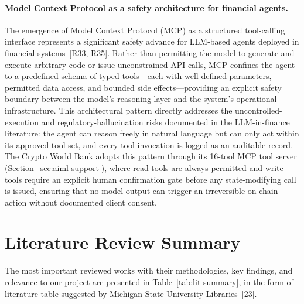 \documentclass[12pt,a4paper]{report}
\begin{document}
\paragraph{Model Context Protocol as a safety architecture for financial agents.}
The emergence of Model Context Protocol (MCP) as a structured tool-calling interface represents a significant safety advance for LLM-based agents deployed in financial systems~[R33, R35]. Rather than permitting the model to generate and execute arbitrary code or issue unconstrained API calls, MCP confines the agent to a predefined schema of typed tools---each with well-defined parameters, permitted data access, and bounded side effects---providing an explicit safety boundary between the model's reasoning layer and the system's operational infrastructure. This architectural pattern directly addresses the uncontrolled-execution and regulatory-hallucination risks documented in the LLM-in-finance literature: the agent can reason freely in natural language but can only act within its approved tool set, and every tool invocation is logged as an auditable record. The Crypto World Bank adopts this pattern through its 16-tool MCP tool server (Section~\ref{sec:aiml-support}), where read tools are always permitted and write tools require an explicit human confirmation gate before any state-modifying call is issued, ensuring that no model output can trigger an irreversible on-chain action without documented client consent.

\section{Literature Review Summary}

The most important reviewed works with their methodologies, key findings, and relevance to our project are presented in Table~\ref{tab:lit-summary}, in the form of literature table suggested by Michigan State University Libraries~[23].
\end{document}
